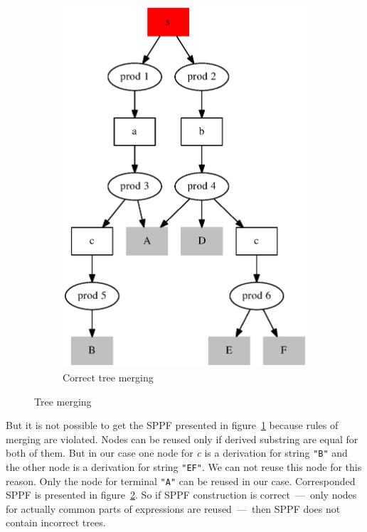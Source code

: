\documentclass{acm_proc_article-sp}
\begin{document}
\begin{figure}[h!]
\begin{center}
\begin{subfigure}{0.2\textwidth}
    	\label{tree_sql_3}
    \end{subfigure}
    ~
    \begin{subfigure}{0.2\textwidth}      
       \includegraphics[scale=0.3]{graphs/SPPF_proof_correct.eps}    
    	\caption{Correct tree merging}
    	\label{SPPF_correct_merging}
    \end{subfigure}
    \caption{Tree merging}
    \label{trees_merging}
  \end{center}
\end{figure}


But it is not possible to get the SPPF presented in figure~\ref{tree_sql_3} because rules of merging are violated. Nodes can be reused only if derived substring are equal for both of them. But in our case one node for {\it c} is a derivation for string \verb|"B"| and the other node is a derivation for string \verb|"EF"|. We can not reuse this node for this reason. Only the node for terminal \verb|"A"| can be reused in our case. Corresponded SPPF is presented in figure~\ref{SPPF_correct_merging}. So if SPPF construction is correct~---~only nodes for actually common parts of expressions are reused~---~then SPPF does not contain incorrect trees.
\end{document}
